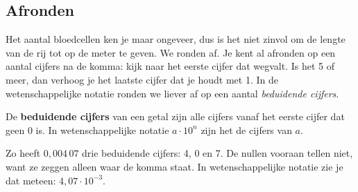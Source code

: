 

\begin{oefeningen}
\end{oefeningen}

\subsection{Afronden}

Het aantal bloedcellen ken je maar ongeveer, dus is het niet zinvol om de lengte van de rij tot op de meter te geven. We ronden af. Je kent al afronden op een aantal cijfers na de komma: kijk naar het eerste cijfer dat wegvalt. Is het 5 of meer, dan verhoog je het laatste cijfer dat je houdt met 1. In de wetenschappelijke notatie ronden we liever af op een aantal \textit{beduidende cijfers}.

\begin{theorie}
De \textbf{\textcolor{accent}{beduidende cijfers}} van een getal zijn alle cijfers vanaf het eerste cijfer dat geen 0 is. In wetenschappelijke notatie $a \cdot 10^n$ zijn het de cijfers van $a$.
\end{theorie}

Zo heeft $0,004\,07$ drie beduidende cijfers: 4, 0 en 7. De nullen vooraan tellen niet, want ze zeggen alleen waar de komma staat. In wetenschappelijke notatie zie je dat meteen: $4,07 \cdot 10^{-3}$.


